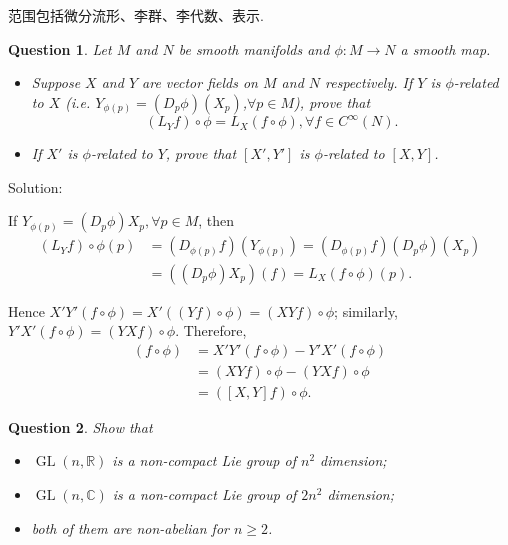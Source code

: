 \theoremstyle{plain}\newtheorem{exercise}{Question}
\nosectionnumbers

范围包括微分流形、李群、李代数、表示.

\begin{exercise}
    Let $M$ and $N$ be smooth manifolds and $\phi: M\to N$
    a smooth map.

    \begin{itemize}
        \item Suppose $X$ and $Y$ are vector fields on $M$
            and $N$ respectively. If $Y$ is $\phi$-related to $X$
            (i.e. $Y_{\phi(p)}=(D_p \phi)(X_p)$,$\forall p \in M$),
            prove that
            \begin{equation*}
                (L_Y f)\circ \phi = L_X(f\circ \phi), 
                \forall f \in C^{\infty} (N).
            \end{equation*}

        \item If $X'$ is $\phi$-related to $Y$, prove that
            $[X',Y']$ is $\phi$-related to $[X,Y]$.
    \end{itemize}
\end{exercise}

Solution:

If $Y_{\phi (p)}=(D_p \phi)X_p,\forall p \in M$, then
\begin{align}
    (L_Y f)\circ \phi (p) &= (D_{\phi(p)}f)(Y_{\phi(p)})
    = (D_{\phi(p)}f)(D_p \phi)(X_p) \\
    &= ((D_p \phi)X_p)(f) = L_X(f\circ \phi)(p).
\end{align}

Hence $X'Y'(f\circ \phi)=X'((Yf)\circ \phi)=(XYf)\circ \phi$;
similarly, $Y'X'(f\circ \phi)=(YXf)\circ \phi$. Therefore,
\begin{align}
    [X',Y'](f\circ \phi) &= X'Y'(f\circ \phi)-Y'X'(f\circ \phi) \\
    &= (XYf)\circ \phi - (YXf)\circ \phi \\
    &= ([X,Y]f)\circ \phi.
\end{align}


\begin{exercise}
    Show that
    \begin{itemize}
        \item $\operatorname{GL}(n,\mathbb{R})$ is a non-compact Lie group of $n^2$ dimension;
        \item $\operatorname{GL}(n,\mathbb{C})$ is a non-compact Lie group of $2n^2$ dimension;
        \item both of them are non-abelian for $n\ge 2$.
    \end{itemize}
\end{exercise}

